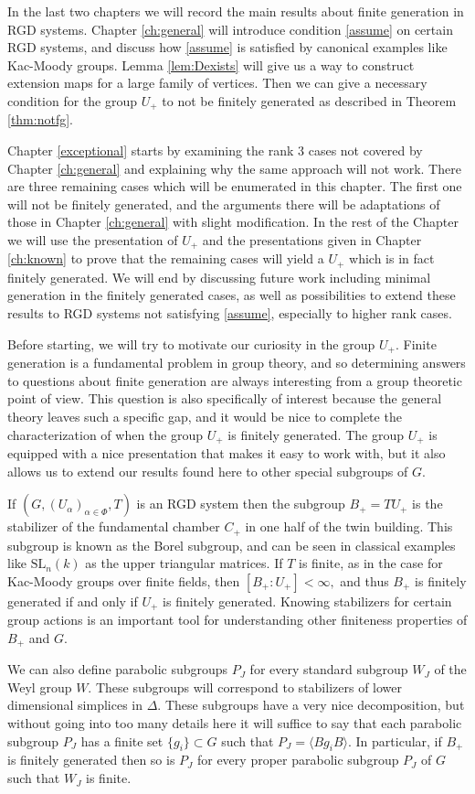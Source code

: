 \documentclass[class=book, crop=false,12 pt]{standalone}
\begin{document}
In the last two chapters we will record the main results about finite generation in RGD systems. Chapter \ref{ch:general} will introduce condition \eqref{assume} on certain RGD systems, and discuss how \eqref{assume} is satisfied by canonical examples like Kac-Moody groups. Lemma \ref{lem:Dexists} will give us a way to construct extension maps for a large family of vertices. Then we can give a necessary condition for the group $U_+$ to not be finitely generated as described in Theorem \ref{thm:notfg}.

Chapter \ref{exceptional} starts by examining the rank 3 cases not covered by Chapter \ref{ch:general} and explaining why the same approach will not work. There are three remaining cases which will be enumerated in this chapter. The first one will not be finitely generated, and the arguments there will be adaptations of those in Chapter \ref{ch:general} with slight modification. In the rest of the Chapter we will use the presentation of $U_+$ and the presentations given in Chapter \ref{ch:known} to prove that the remaining cases will yield a $U_+$ which is in fact finitely generated. We will end by discussing future work including minimal generation in the finitely generated cases, as well as possibilities to extend these results to RGD systems not satisfying \eqref{assume}, especially to higher rank cases.

Before starting, we will try to motivate our curiosity in the group $U_+.$ Finite generation is a fundamental problem in group theory, and so determining answers to questions about finite generation are always interesting from a group theoretic point of view. This question is also specifically of interest because the general theory leaves such a specific gap, and it would be nice to complete the characterization of when the group $U_+$ is finitely generated. The group $U_+$ is equipped with a nice presentation that makes it easy to work with, but it also allows us to extend our results found here to other special subgroups of $G.$

If $(G,(U_\alpha)_{\alpha\in \Phi},T)$ is an RGD system then the subgroup $B_+=TU_+$ is the stabilizer of the fundamental chamber $C_+$ in one half of the twin building. This subgroup is known as the Borel subgroup, and can be seen in classical examples like $\mathrm{SL}_n(k)$ as the upper triangular matrices. If $T$ is finite, as in the case for Kac-Moody groups over finite fields, then $[B_+:U_+]<\infty,$ and thus $B_+$ is finitely generated if and only if $U_+$ is finitely generated. Knowing stabilizers for certain group actions is an important tool for understanding other finiteness properties of $B_+$ and $G.$ 

We can also define parabolic subgroups $P_J$ for every standard subgroup $W_J$ of the Weyl group $W.$ These subgroups will correspond to stabilizers of lower dimensional simplices in $\Delta.$ These subgroups have a very nice decomposition, but without going into too many details here it will suffice to say that each parabolic subgroup $P_J$ has a finite set $\{g_i\}\subset G$ such that $P_J=\langle Bg_iB\rangle.$ In particular, if $B_+$ is finitely generated then so is $P_J$ for every proper parabolic subgroup $P_J$ of $G$ such that $W_J$ is finite.
\end{document}
